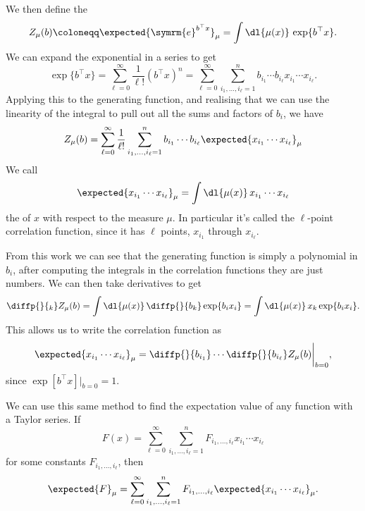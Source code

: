 \documentclass[fleqn]{NotesClass}
\newcommand{\e}{\symrm{e}}
\newcommand{\trans}{{\top}}
\begin{document}
    We then define the 
    \begin{equation}
        Z_\mu(b) \coloneqq \expected{\e^{b^\trans x}}_\mu = \int \dl{\mu(x)} \, \exp\{b^\trans x\}.
    \end{equation}
    We can expand the exponential in a series to get
    \begin{equation}
        \exp\{b^\trans x\} = \sum_{\ell = 0}^{\infty} \frac{1}{\ell!} (b^\trans x)^n = \sum_{\ell = 0}^{\infty} \sum_{i_1, \dotsc, i_{\ell} = 1}^{n} b_{i_1}\dotsm b_{i_\ell} x_{i_1} \dotsm x_{i_\ell}.
    \end{equation}
    Applying this to the generating function, and realising that we can use the linearity of the integral to pull out all the sums and factors of \(b_i\), we have
    \begin{equation}
        Z_\mu(b) = \sum_{\ell = 0}^{\infty} \frac{1}{\ell!} \sum_{i_1, \dotsc, i_\ell = 1}^{n} b_{i_1} \dotsm b_{i_\ell} \expected{x_{i_1} \dotsm x_{i_\ell}}_\mu
    \end{equation}
    We call
    \begin{equation}
        \expected{x_{i_1} \dotsm x_{i_\ell}}_\mu = \int \dl{\mu(x)} \, x_{i_1} \dotsm x_{i_\ell}
    \end{equation}
    the  of \(x\) with respect to the measure \(\mu\).
    In particular it's called the \(\ell\)-point correlation function, since it has \(\ell\) points, \(x_{i_1}\) through \(x_{i_\ell}\).
    
    From this work we can see that the generating function is simply a polynomial in \(b_i\), after computing the integrals in the correlation functions they are just numbers.
    We can then take derivatives to get
    \begin{equation}
        \diffp{}{_k} Z_\mu(b) = \int \dl{\mu(x)} \, \diffp{}{b_k} \exp\{b_ix_i\} = \int \dl{\mu(x)} \, x_k \exp\{b_ix_i\}.
    \end{equation}
    This allows us to write the correlation function as
    \begin{equation}
        \expected{x_{i_1} \dotsm x_{i_\ell}}_\mu = \diffp{}{b_{i_1}} \dotsm \diffp{}{b_{i_\ell}} Z_\mu(b) \bigg|_{b = 0},
    \end{equation}
    since \(\exp[b^\trans x]|_{b = 0} = 1\).
    
    We can use this same method to find the expectation value of any function with a Taylor series.
    If
    \begin{equation}\label{eqn:taylor series}
        F(x) = \sum_{\ell = 0}^{\infty} \sum_{i_1, \dotsc, i_{\ell} = 1}^{n} F_{i_1, \dotsc, i_{\ell}} x_{i_1} \dotsm x_{i_\ell}
    \end{equation}
    for some constants \(F_{i_1, \dotsc, i_{\ell}}\), then
    \begin{equation}
        \expected{F}_\mu = \sum_{\ell = 0}^{\infty} \sum_{i_1, \dotsc, i_{\ell} = 1}^{n} F_{i_1, \dotsc, i_{\ell}} \expected{x_{i_1} \dotsm x_{i_\ell}}_\mu.
    \end{equation}
    
\end{document}
